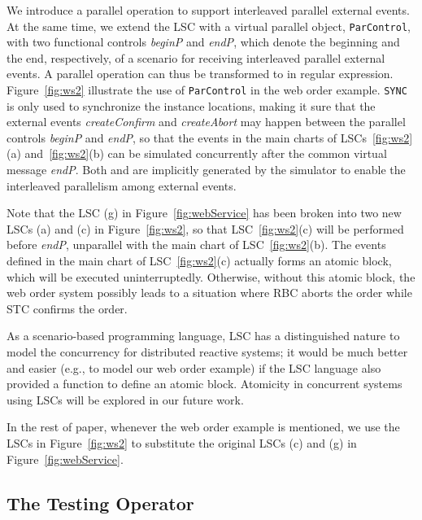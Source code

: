 \documentclass[]{llncs}
\begin{document}
We introduce a parallel operation  to support
interleaved parallel external events.
At the same time, we extend the LSC with a virtual parallel object,
{\tt ParControl}, with two functional controls {\em beginP} and {\em endP},
which denote the beginning
and the end, respectively, of a scenario for receiving
interleaved parallel external events. A parallel operation
 can thus be transformed to  in regular
expression. Figure~\ref{fig:ws2} illustrate the use of {\tt ParControl} in
the web order example. {\tt SYNC} is only used to synchronize the
instance locations, making it sure that the external events {\em createConfirm} and
{\em createAbort} may happen between the parallel controls {\em beginP} and
{\em endP}, so that the events in the main charts of LSCs~\ref{fig:ws2}(a)
and~\ref{fig:ws2}(b) can be simulated concurrently after the common
virtual message {\em endP}. Both  and  are implicitly
generated by the simulator to enable the interleaved parallelism among
external events.

Note that the LSC (g) in Figure~\ref{fig:webService} has been
broken into two new LSCs (a) and (c) in Figure~\ref{fig:ws2},
so that LSC~\ref{fig:ws2}(c) will be performed before {\em endP},
unparallel with the main chart of LSC~\ref{fig:ws2}(b).
The events defined in the main chart of LSC~\ref{fig:ws2}(c)
actually forms an atomic block, which will be executed uninterruptedly.
Otherwise, without this atomic block, the web order system possibly leads to
a situation where RBC aborts the order while STC confirms the order.

As a scenario-based programming language, LSC has a distinguished nature
to model the concurrency for distributed reactive systems;
it would be much better and easier (e.g., to model our web order example)
if the LSC language also provided a function to define an atomic block.
Atomicity in concurrent systems using LSCs will be explored in our future work.

In the rest of paper, whenever the web order example is mentioned,
we use the LSCs in Figure~\ref{fig:ws2} to substitute the original
LSCs (c) and (g) in Figure~\ref{fig:webService}.

\subsection{The Testing Operator }
\end{document}
